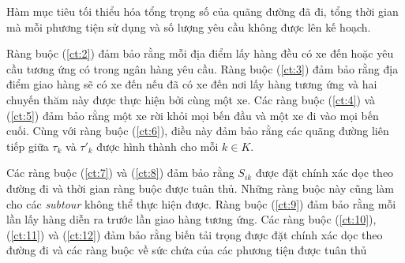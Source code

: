 Hàm mục tiêu tối thiểu hóa tổng trọng số của quãng đường đã đi, tổng thời gian mà mỗi phương tiện sử dụng và số lượng yêu cầu không được lên kế hoạch.

Ràng buộc (\ref{ct:2}) đảm bảo rằng mỗi địa điểm lấy hàng đều có xe đến hoặc yêu cầu tương ứng có trong ngân hàng yêu cầu. Ràng buộc (\ref{ct:3}) đảm bảo rằng địa điểm giao hàng sẽ có xe đến nếu đã có xe đến nơi lấy hàng tương ứng và hai chuyến thăm này được thực hiện bởi cùng một xe. Các ràng buộc (\ref{ct:4}) và (\ref{ct:5}) đảm bảo rằng một xe rời khỏi mọi bến đầu và một xe đi vào mọi bến cuối. Cùng với ràng buộc (\ref{ct:6}), điều này đảm bảo rằng các quãng đường liên tiếp giữa $\tau_k$ và $\tau'_k$ được hình thành cho mỗi $k \in K$.

Các ràng buộc (\ref{ct:7}) và (\ref{ct:8}) đảm bảo rằng $S_{ik}$ được đặt chính xác dọc theo đường đi và thời gian ràng buộc được tuân thủ. Những ràng buộc này cũng làm cho các \textit{subtour} không thể thực hiện được.
Ràng buộc (\ref{ct:9}) đảm bảo rằng mỗi lần lấy hàng diễn ra trước lần giao hàng tương ứng. Các ràng buộc (\ref{ct:10}), (\ref{ct:11}) và (\ref{ct:12}) đảm bảo rằng biến tải trọng được đặt chính xác dọc theo đường đi và các ràng buộc về sức chứa của các phương tiện được tuân thủ

